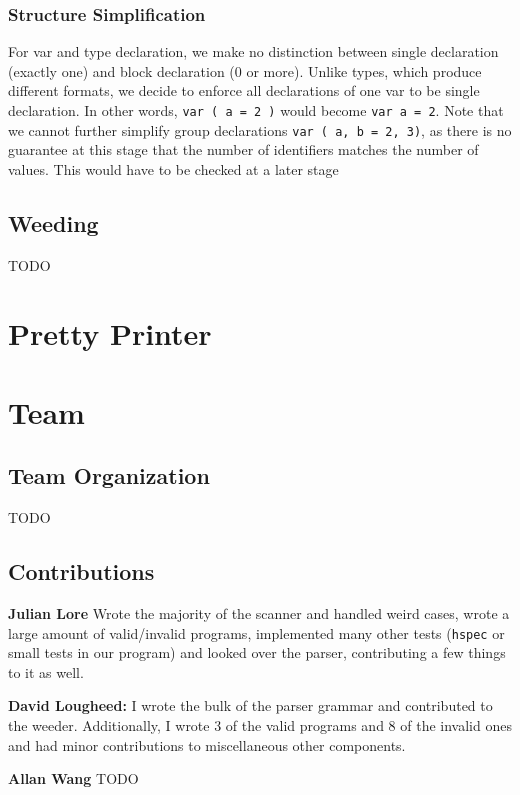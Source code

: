\documentclass[11pt]{article}
\begin{document}
\subsubsection{Structure Simplification}
\label{sec:org09a1f3b}
For var and type declaration, we make no distinction between
single declaration (exactly one) and block declaration (0 or
more). Unlike types, which produce different formats, we decide to
enforce all declarations of one var to be single declaration. In
other words, \texttt{var ( a = 2 )} would become \texttt{var a = 2}. Note that
we cannot further simplify group declarations \texttt{var ( a, b = 2,
    3)}, as there is no guarantee at this stage that the number of
identifiers matches the number of values. This would have to be
checked at a later stage
\subsection{Weeding}
\label{sec:org83e25d2}
TODO
\section{Pretty Printer}
\label{sec:org301d7ec}
\section{Team}
\label{sec:org5a7fc3f}
\subsection{Team Organization}
\label{sec:org10cf341}
TODO
\subsection{Contributions}
\label{sec:orge305ec4}
\textbf{Julian Lore} Wrote the majority of the scanner and handled weird
cases, wrote a large amount of valid/invalid programs, implemented
many other tests (\texttt{hspec} or small tests in our program) and looked
over the parser, contributing a few things to it as well.

\textbf{David Lougheed:} I wrote the bulk of the parser grammar and contributed to
the weeder. Additionally, I wrote 3 of the valid programs and 8 of the
invalid ones and had minor contributions to miscellaneous other components.

\textbf{Allan Wang} TODO
\end{document}
